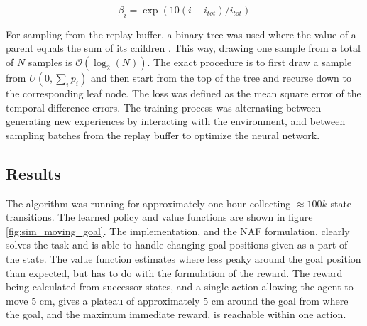 \begin{equation}
    \beta_i = \exp \left( 10(i - i_{tot}) / i_{tot}\right)
\end{equation}

For sampling from the replay buffer, a binary tree was used where the value of
a parent equals the sum of its children \cite{schaul2015prioritized}. This way,
drawing one sample from a total of $N$ samples is $\mathcal{O}(\log_2(N))$. The
exact procedure is to first draw a sample from $U(0, \sum_i p_i)$ and then
start from the top of the tree and recurse down to the corresponding leaf node.
The loss was defined as the mean square error of the temporal-difference
errors. The training process was alternating between generating new experiences
by interacting with the environment, and between sampling batches from the
replay buffer to optimize the neural network.

\subsection{Results}

The algorithm was running for approximately one hour collecting $\approx 100k$
state transitions. The learned policy and value functions are shown in figure
\ref{fig:sim_moving_goal}. The implementation, and the NAF formulation, clearly
solves the task and is able to handle changing goal positions given as a part
of the state. The value function estimates where less peaky around the goal
position than expected, but has to do with the formulation of the reward. The
reward being calculated from successor states, and a single action allowing the
agent to move $5$ cm, gives a plateau of approximately $5$ cm around the goal
from where the goal, and the maximum immediate reward, is reachable within one
action.

